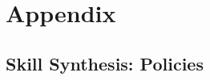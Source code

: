 \chapter{Appendix}\label{ch:appendix}
\section{Skill Synthesis: Policies}\label{ch:appendix:policies}

% 